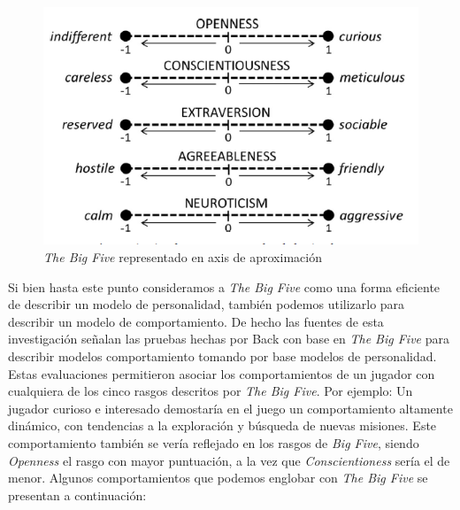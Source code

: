\documentclass[conference]{IEEEtran}
\begin{document}
\begin{figure}[tph!]
\centerline{\includegraphics[totalheight=5cm]{3}}
    \caption{\textit{The Big Five} representado en axis de aproximación}
    \label{fig:red3}
\end{figure}

Si bien hasta este punto consideramos a \textit{The Big Five} como una forma eficiente de describir un modelo de personalidad, también podemos utilizarlo para describir un modelo de comportamiento. De hecho las fuentes de esta investigación señalan las pruebas hechas por Back \citep{back2009predicting} con base en \textit{The Big Five} para describir modelos comportamiento tomando por base  modelos de personalidad. Estas evaluaciones permitieron asociar los comportamientos de un jugador con cualquiera de los  cinco rasgos descritos por \textit{The Big Five}. Por ejemplo: Un jugador curioso e interesado demostaría en el juego un comportamiento altamente dinámico, con tendencias a la exploración y búsqueda de nuevas misiones. Este comportamiento también se vería reflejado en los rasgos de \textit{Big Five}, siendo \textit{Openness} el rasgo con mayor puntuación, a la vez que \textit{Conscientioness} sería el de menor. Algunos comportamientos que podemos englobar con \textit{The Big Five} se presentan a continuación:
\end{document}
